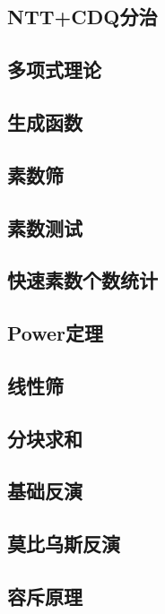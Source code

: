 \documentclass{article}
\begin{document}
\subsection{NTT+CDQ分治} 

\subsection{多项式理论} 

\subsection{生成函数} 


\subsection{素数筛} 

\subsection{素数测试} 

\subsection{快速素数个数统计} 

\subsection{Power定理} 


\subsection{线性筛} 

\subsection{分块求和} 

\subsection{基础反演} 

\subsection{莫比乌斯反演} 

\subsection{容斥原理} 

\end{document}
